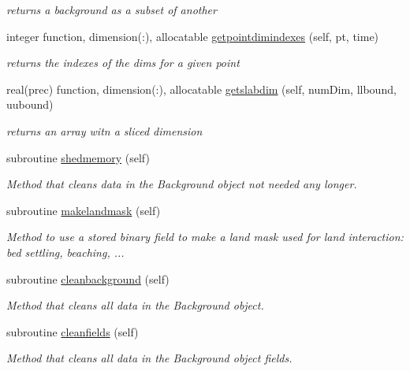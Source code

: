 \begin{DoxyCompactItemize}
\begin{DoxyCompactList}\small\item\em returns a background as a subset of another \end{DoxyCompactList}\item 
integer function, dimension(\+:), allocatable \mbox{\hyperlink{namespacebackground__mod_ac799224ce7ad219bf1fb4f1f42508f45}{getpointdimindexes}} (self, pt, time)
\begin{DoxyCompactList}\small\item\em returns the indexes of the dims for a given point \end{DoxyCompactList}\item 
real(prec) function, dimension(\+:), allocatable \mbox{\hyperlink{namespacebackground__mod_a09d61976c4545e8753eb4594044b109d}{getslabdim}} (self, num\+Dim, llbound, uubound)
\begin{DoxyCompactList}\small\item\em returns an array witn a sliced dimension \end{DoxyCompactList}\item 
subroutine \mbox{\hyperlink{namespacebackground__mod_a2c75c9011305adad2f19fc2233df700d}{shedmemory}} (self)
\begin{DoxyCompactList}\small\item\em Method that cleans data in the Background object not needed any longer. \end{DoxyCompactList}\item 
subroutine \mbox{\hyperlink{namespacebackground__mod_ad6c54d2cf1d1981fb928cd14d387aa8b}{makelandmask}} (self)
\begin{DoxyCompactList}\small\item\em Method to use a stored binary field to make a land mask used for land interaction\+: bed settling, beaching, ... \end{DoxyCompactList}\item 
subroutine \mbox{\hyperlink{namespacebackground__mod_a1610fcc9ce260beb3c35418e92a63391}{cleanbackground}} (self)
\begin{DoxyCompactList}\small\item\em Method that cleans all data in the Background object. \end{DoxyCompactList}\item 
subroutine \mbox{\hyperlink{namespacebackground__mod_a843a471a68ce83809e3ed0a40886a4e7}{cleanfields}} (self)
\begin{DoxyCompactList}\small\item\em Method that cleans all data in the Background object fields. \end{DoxyCompactList}\item 

\end{DoxyCompactItemize}
